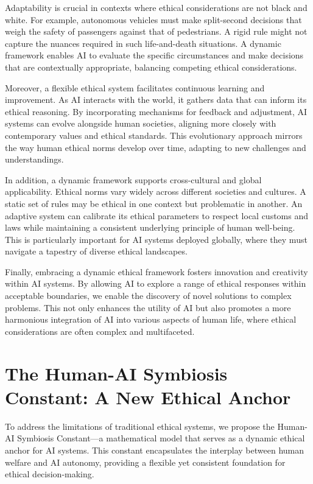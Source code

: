 \documentclass[12pt]{article}
\begin{document}
Adaptability is crucial in contexts where ethical considerations are not black and white. For example, autonomous vehicles must make split-second decisions that weigh the safety of passengers against that of pedestrians. A rigid rule might not capture the nuances required in such life-and-death situations. A dynamic framework enables AI to evaluate the specific circumstances and make decisions that are contextually appropriate, balancing competing ethical considerations.

Moreover, a flexible ethical system facilitates continuous learning and improvement. As AI interacts with the world, it gathers data that can inform its ethical reasoning. By incorporating mechanisms for feedback and adjustment, AI systems can evolve alongside human societies, aligning more closely with contemporary values and ethical standards. This evolutionary approach mirrors the way human ethical norms develop over time, adapting to new challenges and understandings.

In addition, a dynamic framework supports cross-cultural and global applicability. Ethical norms vary widely across different societies and cultures. A static set of rules may be ethical in one context but problematic in another. An adaptive system can calibrate its ethical parameters to respect local customs and laws while maintaining a consistent underlying principle of human well-being. This is particularly important for AI systems deployed globally, where they must navigate a tapestry of diverse ethical landscapes.

Finally, embracing a dynamic ethical framework fosters innovation and creativity within AI systems. By allowing AI to explore a range of ethical responses within acceptable boundaries, we enable the discovery of novel solutions to complex problems. This not only enhances the utility of AI but also promotes a more harmonious integration of AI into various aspects of human life, where ethical considerations are often complex and multifaceted.

\newpage



\section{The Human-AI Symbiosis Constant: A New Ethical Anchor}

To address the limitations of traditional ethical systems, we propose the Human-AI Symbiosis Constant—a mathematical model that serves as a dynamic ethical anchor for AI systems. This constant encapsulates the interplay between human welfare and AI autonomy, providing a flexible yet consistent foundation for ethical decision-making.
\end{document}
